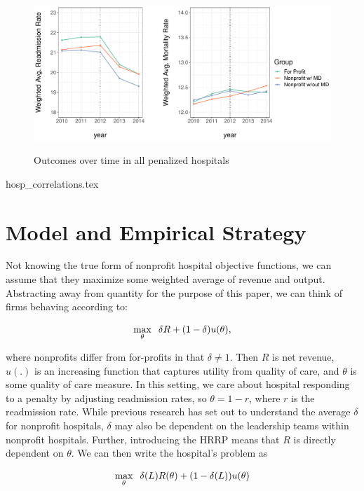 \documentclass[12pt]{article}
\begin{document}
    \begin{figure}[ht!]
    \centering
        \caption{Outcomes over time in all penalized hospitals}
        \includegraphics[width=\textwidth]{Objects/weighted_read_mort_graph.pdf}
        \label{fig:weighted_read_mort_graph}
    \end{figure}

    {hosp_correlations.tex}

    \section{Model and Empirical Strategy}

    Not knowing the true form of nonprofit hospital objective functions, we can assume that they maximize some weighted average of revenue and output. Abstracting away from quantity for the purpose of this paper, we can think of firms behaving according to:     
    
    $$\max_{\theta}\hspace{2mm} \delta R + (1-\delta) u(\theta),$$

    \noindent where nonprofits differ from for-profits in that $\delta\neq 1$. Then $R$ is net revenue, $u(.)$ is an increasing function that captures utility from quality of care, and $\theta$ is some quality of care measure. In this setting, we care about hospital responding to a penalty by adjusting readmission rates, so $\theta = 1-r$, where $r$ is the readmission rate. While previous research has set out to understand the average $\delta$ for nonprofit hospitals, $\delta$ may also be dependent on the leadership teams within nonprofit hospitals. Further, introducing the HRRP means that $R$ is directly dependent on $\theta$. We can then write the hospital's problem as 

    $$\max_{\theta}\hspace{2mm} \delta(L) R(\theta) + (1-\delta(L)) u(\theta)$$
\end{document}

